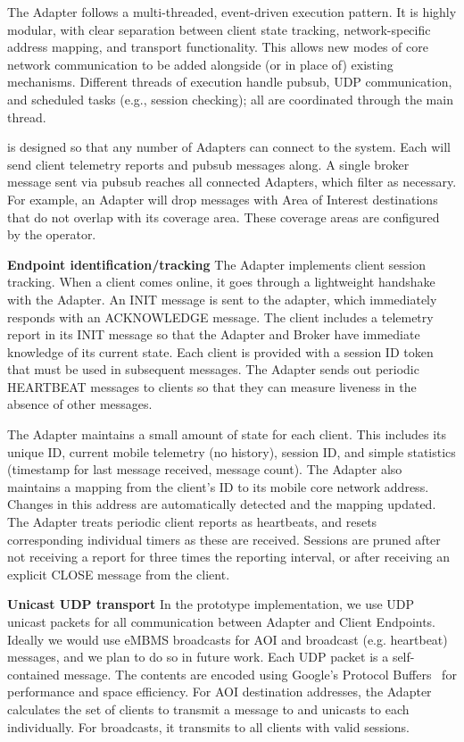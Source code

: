 The \name{} Adapter follows a multi-threaded, event-driven execution
pattern. It is highly modular, with clear separation between client
state tracking, network-specific address mapping, and transport
functionality.  This allows new modes of core network communication to
be added alongside (or in place of) existing mechanisms.  Different
threads of execution handle pubsub, UDP communication, and scheduled
tasks (e.g., session checking); all are coordinated through the main
thread.

\name{} is designed so that any number of Adapters can connect to the
\pubsub system. Each will send client telemetry reports and pubsub
messages along. A single broker message sent via pubsub reaches all
connected Adapters, which filter as necessary. For example, an Adapter
will drop messages with Area of Interest destinations that do not
overlap with its coverage area. These coverage areas are configured by
the operator.
  
\textbf{Endpoint identification/tracking} The Adapter implements
client session tracking. When a client comes online, it goes through a
lightweight handshake with the Adapter. An INIT message is sent to the
adapter, which immediately responds with an ACKNOWLEDGE message. The
client includes a telemetry report in its INIT message so that the
Adapter and Broker have immediate knowledge of its current state. Each
client is provided with a session ID token that must be used in
subsequent messages.  The Adapter sends out periodic HEARTBEAT
messages to clients so that they can measure liveness in the absence
of other messages.

The Adapter maintains a small amount of state for each client. This
includes its unique ID, current mobile telemetry (no history), session
ID, and simple statistics (timestamp for last message received,
message count). The Adapter also maintains a mapping from the client's
ID to its mobile core network address. Changes in this address are
automatically detected and the mapping updated. The Adapter treats
periodic client reports as heartbeats, and resets corresponding
individual timers as these are received. Sessions are pruned after not
receiving a report for three times the reporting interval, or after
receiving an explicit CLOSE message from the client.

\textbf{Unicast UDP transport} In the prototype implementation, we use
UDP unicast packets for all communication between Adapter and Client
Endpoints. Ideally we would use eMBMS broadcasts for AOI and broadcast
(e.g. heartbeat) messages, and we plan to do so in future work. Each
UDP packet is a self-contained \name{} message. The contents are
encoded using Google's Protocol Buffers~\cite{buffers2011google} for
performance and space efficiency. For AOI destination addresses, the
Adapter calculates the set of clients to transmit a message to and
unicasts to each individually. For broadcasts, it transmits to all
clients with valid sessions.

